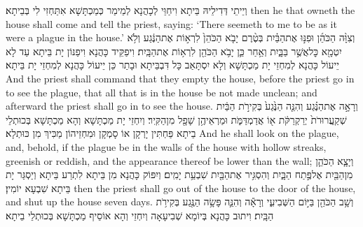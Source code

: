 {וְיֵיתֵי דְּדִילֵיהּ בֵּיתָא וִיחַוֵּי לְכָהֲנָא לְמֵימַר כְּמַכְתָּשָׁא אִתַּחְזִי לִי בְּבֵיתָא׃}
{then he that owneth the house shall come and tell the priest, saying: ‘There seemeth to me to be as it were a plague in the house.’}{}
{וְצִוָּ֨ה הַכֹּהֵ֜ן וּפִנּ֣וּ אֶת\maqqaf הַבַּ֗יִת בְּטֶ֨רֶם יָבֹ֤א הַכֹּהֵן֙ לִרְא֣וֹת אֶת\maqqaf הַנֶּ֔גַע וְלֹ֥א יִטְמָ֖א כׇּל\maqqaf אֲשֶׁ֣ר בַּבָּ֑יִת וְאַ֥חַר כֵּ֛ן יָבֹ֥א הַכֹּהֵ֖ן לִרְא֥וֹת אֶת\maqqaf הַבָּֽיִת׃}
{וִיפַקֵּיד כָּהֲנָא וִיפַנּוֹן יָת בֵּיתָא עַד לָא יֵיעוֹל כָּהֲנָא לְמִחְזֵי יָת מַכְתָּשָׁא וְלָא יִסְתָּאַב כָּל דִּבְבֵּיתָא וּבָתַר כֵּן יֵיעוֹל כָּהֲנָא לְמִחְזֵי יָת בֵּיתָא׃}
{And the priest shall command that they empty the house, before the priest go in to see the plague, that all that is in the house be not made unclean; and afterward the priest shall go in to see the house.}{}
{וְרָאָ֣ה אֶת\maqqaf הַנֶּ֗גַע וְהִנֵּ֤ה הַנֶּ֙גַע֙ בְּקִירֹ֣ת הַבַּ֔יִת שְׁקַֽעֲרוּרֹת֙ יְרַקְרַקֹּ֔ת א֖וֹ אֲדַמְדַּמֹּ֑ת וּמַרְאֵיהֶ֥ן שָׁפָ֖ל מִן\maqqaf הַקִּֽיר׃}
{וְיִחְזֵי יָת מַכְתָּשָׁא וְהָא מַכְתָּשָׁא בְּכוּתְלֵי בֵיתָא פַּחְתִּין יָרְקָן אוֹ סָמְקָן וּמִחְזֵיהוֹן מַכִּיךְ מִן כּוּתְלָא׃}
{And he shall look on the plague, and, behold, if the plague be in the walls of the house with hollow streaks, greenish or reddish, and the appearance thereof be lower than the wall;}{}
{וְיָצָ֧א הַכֹּהֵ֛ן מִן\maqqaf הַבַּ֖יִת אֶל\maqqaf פֶּ֣תַח הַבָּ֑יִת וְהִסְגִּ֥יר אֶת\maqqaf הַבַּ֖יִת שִׁבְעַ֥ת יָמִֽים׃}
{וְיִפּוֹק כָּהֲנָא מִן בֵּיתָא לִתְרַע בֵּיתָא וְיַסְגַּר יָת בֵּיתָא שִׁבְעָא יוֹמִין׃}
{then the priest shall go out of the house to the door of the house, and shut up the house seven days.}{}
{וְשָׁ֥ב הַכֹּהֵ֖ן בַּיּ֣וֹם הַשְּׁבִיעִ֑י וְרָאָ֕ה וְהִנֵּ֛ה פָּשָׂ֥ה הַנֶּ֖גַע בְּקִירֹ֥ת הַבָּֽיִת׃}
{וִיתוּב כָּהֲנָא בְּיוֹמָא שְׁבִיעָאָה וְיִחְזֵי וְהָא אוֹסֵיף מַכְתָּשָׁא בְּכוּתְלֵי בֵיתָא׃}
